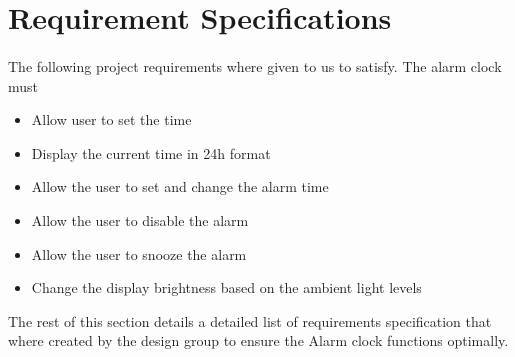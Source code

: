 \documentclass{article}
\begin{document}
\section{Requirement Specifications} %
\paragraph{}
The following project requirements where given to us to satisfy\cite{slides}. The alarm clock must
\begin{itemize}
    \item Allow user to set the time
    \item Display the current time in 24h format
    \item Allow the user to set and change the alarm time
    \item Allow the user to disable the alarm
    \item Allow the user to snooze the alarm
    \item Change the display brightness based on the ambient light levels
\end{itemize}
The rest of this section details a detailed list of requirements specification that where created by the design group to ensure the Alarm clock functions optimally.
\end{document}
